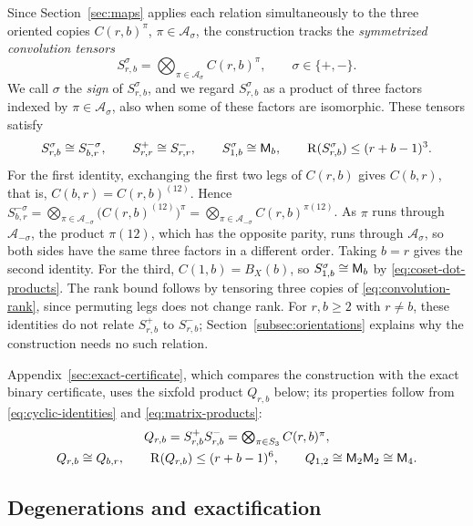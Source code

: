 Since Section~\ref{sec:maps} applies each relation simultaneously to the
three oriented copies \(C(r,b)^\pi\), \(\pi\in\mathcal A_\sigma\), the
construction tracks the \emph{symmetrized convolution tensors}
\begin{equation}\label{eq:cyclic-def}
 S^\sigma_{r,b}=\bigotimes_{\pi\in\mathcal A_\sigma}C(r,b)^\pi,
 \qquad \sigma\in\{+,-\}.
\end{equation}
We call \(\sigma\) the \emph{sign} of \(S^\sigma_{r,b}\), and we regard
\(S^\sigma_{r,b}\) as a product of three factors indexed by
\(\pi\in\mathcal A_\sigma\), also when some of these factors are
isomorphic. These tensors satisfy
\begin{equation}\label{eq:cyclic-identities}
 S^\sigma_{r,b}\cong S^{-\sigma}_{b,r},\qquad
 S^+_{r,r}\cong S^-_{r,r},\qquad
 S^\sigma_{1,b}\cong\mathsf M_b,
 \qquad \operatorname{R}(S^\sigma_{r,b})\le(r+b-1)^3.
\end{equation}
For the first identity, exchanging the first two legs of \(C(r,b)\) gives
\(C(b,r)\), that is, \(C(b,r)=C(r,b)^{(12)}\). Hence
\(S^{-\sigma}_{b,r}
=\bigotimes_{\pi\in\mathcal A_{-\sigma}}\bigl(C(r,b)^{(12)}\bigr)^\pi
=\bigotimes_{\pi\in\mathcal A_{-\sigma}}C(r,b)^{\pi(12)}\). As \(\pi\)
runs through \(\mathcal A_{-\sigma}\), the product \(\pi(12)\), which has
the opposite parity, runs through \(\mathcal A_\sigma\), so both sides have
the same three factors in a different order. Taking \(b=r\) gives the second identity.
For the third, \(C(1,b)=B_X(b)\), so \(S^\sigma_{1,b}\cong\mathsf M_b\) by
\eqref{eq:coset-dot-products}. The rank bound follows by tensoring three
copies of \eqref{eq:convolution-rank}, since permuting legs does not change
rank. For \(r,b\ge2\) with \(r\ne b\), these identities do not relate
\(S^+_{r,b}\) to \(S^-_{r,b}\); Section~\ref{subsec:orientations} explains
why the construction needs no such relation.

Appendix~\ref{sec:exact-certificate}, which compares the construction with
the exact binary certificate, uses the sixfold product \(Q_{r,b}\) below;
its properties follow from \eqref{eq:cyclic-identities}
and \eqref{eq:matrix-products}:
\begin{gather}
 Q_{r,b}=S^+_{r,b}S^-_{r,b}
        =\textstyle\bigotimes_{\pi\in S_3}C(r,b)^\pi ,
 \label{eq:balanced}\\
 Q_{r,b}\cong Q_{b,r},\qquad
 \operatorname{R}(Q_{r,b})\le(r+b-1)^6,\qquad Q_{1,2}\cong\mathsf M_2\mathsf M_2\cong\mathsf M_4 .
 \label{eq:balanced-properties}
\end{gather}

\subsection{Degenerations and exactification}
\label{subsec:prelim-degenerations}

